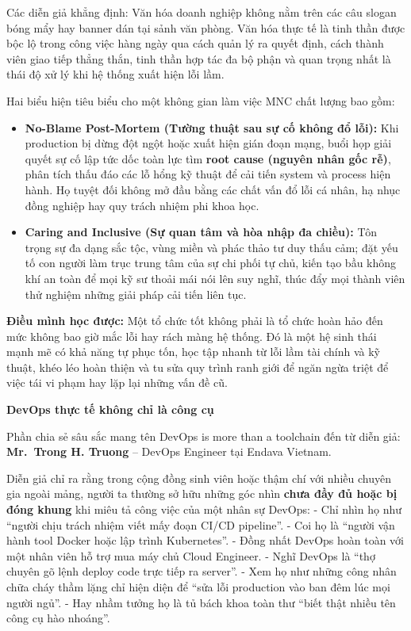 Các diễn giả khẳng định: Văn hóa doanh nghiệp không nằm trên các câu
slogan bóng mẩy hay banner dán tại sảnh văn phòng. Văn hóa thực tế là
tinh thần được bộc lộ trong công việc hàng ngày qua cách quản lý ra
quyết định, cách thành viên giao tiếp thẳng thắn, tinh thần hợp tác đa
bộ phận và quan trọng nhất là thái độ xử lý khi hệ thống xuất hiện lỗi
lầm.

Hai biểu hiện tiêu biểu cho một không gian làm việc MNC chất lượng bao
gồm:

\begin{itemize}
\tightlist
\item
  \textbf{No-Blame Post-Mortem (Tường thuật sau sự cố không đổ lỗi):}
  Khi production bị dừng đột ngột hoặc xuất hiện gián đoạn mạng, buổi
  họp giải quyết sự cố lập tức dốc toàn lực tìm \textbf{root cause
  (nguyên nhân gốc rễ)}, phân tích thấu đáo các lỗ hổng kỹ thuật để cải
  tiến system và process hiện hành. Họ tuyệt đối không mở đầu bằng các
  chất vấn đổ lỗi cá nhân, hạ nhục đồng nghiệp hay quy trách nhiệm phi
  khoa học.
\item
  \textbf{Caring and Inclusive (Sự quan tâm và hòa nhập đa chiều):} Tôn
  trọng sự đa dạng sắc tộc, vùng miền và phác thảo tư duy thấu cảm; đặt
  yếu tố con người làm trục trung tâm của sự chi phối tự chủ, kiến tạo
  bầu không khí an toàn để mọi kỹ sư thoải mái nói lên suy nghĩ, thúc
  đẩy mọi thành viên thử nghiệm những giải pháp cải tiến liên tục.
\end{itemize}

\textbf{Điều mình học được:} Một tổ chức tốt không phải là tổ chức hoàn
hảo đến mức không bao giờ mắc lỗi hay rách màng hệ thống. Đó là một hệ
sinh thái mạnh mẽ có khả năng tự phục tốn, học tập nhanh từ lỗi lầm tài
chính và kỹ thuật, khéo léo hoàn thiện và tu sửa quy trình ranh giới để
ngăn ngừa triệt để việc tái vi phạm hay lặp lại những vấn đề cũ.

\vspace{0.5em}\noindent\textbf{DevOps thực tế không chỉ là công
cụ}\par

Phần chia sẻ sâu sắc mang tên DevOps is more than a toolchain đến từ
diễn giả: \textbf{Mr.~Trong H. Truong} -- DevOps Engineer tại Endava
Vietnam.

Diễn giả chỉ ra rằng trong cộng đồng sinh viên hoặc thậm chí với nhiều
chuyên gia ngoài mảng, người ta thường sở hữu những góc nhìn
\textbf{chưa đầy đủ hoặc bị đóng khung} khi miêu tả công việc của một
nhân sự DevOps: - Chỉ nhìn họ như ``người chịu trách nhiệm viết mấy đoạn
CI/CD pipeline''. - Coi họ là ``người vận hành tool Docker hoặc lập
trình Kubernetes''. - Đồng nhất DevOps hoàn toàn với một nhân viên hỗ
trợ mua máy chủ Cloud Engineer. - Nghĩ DevOps là ``thợ chuyên gõ lệnh
deploy code trực tiếp ra server''. - Xem họ như những công nhân chữa
cháy thầm lặng chỉ hiện diện để ``sửa lỗi production vào ban đêm lúc mọi
người ngủ''. - Hay nhầm tưởng họ là tủ bách khoa toàn thư ``biết thật
nhiều tên công cụ hào nhoáng''.


